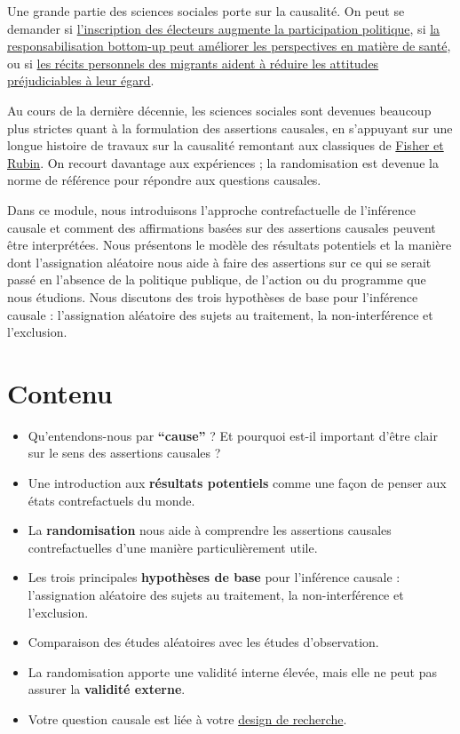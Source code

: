 \documentclass[
  12pt,
]{book}
\begin{document}
Une grande partie des sciences sociales porte sur la causalité. On peut se demander si \href{https://egap.org/resource/electoral-administration-in-kenya/}{l'inscription des électeurs augmente la participation politique}, si \href{https://egap.org/resource/does-bottom-up-accountability-work-evidence-from-uganda/}{la responsabilisation bottom-up peut améliorer les perspectives en matière de santé}, ou si \href{https://egap.org/resource/brief-70-how-personal-narratives-reduce-negative-attitudes-towards-immigrants-in-kenya/}{les récits personnels des migrants aident à réduire les attitudes préjudiciables à leur égard}.

Au cours de la dernière décennie, les sciences sociales sont devenues beaucoup plus strictes quant à la formulation des assertions causales, en s'appuyant sur une longue histoire de travaux sur la causalité remontant aux classiques de \protect\hyperlink{causalinference-classics}{Fisher et Rubin}. On recourt davantage aux expériences ; la randomisation est devenue la norme de référence pour répondre aux questions causales.

Dans ce module, nous introduisons l'approche contrefactuelle de l'inférence causale et comment des affirmations basées sur des assertions causales peuvent être interprétées. Nous présentons le modèle des résultats potentiels et la manière dont l'assignation aléatoire nous aide à faire des assertions sur ce qui se serait passé en l'absence de la politique publique, de l'action ou du programme que nous étudions. Nous discutons des trois hypothèses de base pour l'inférence causale : l'assignation aléatoire des sujets au traitement, la non-interférence et l'exclusion.

\hypertarget{contenu-1}{%
\section{Contenu}\label{contenu-1}}

\begin{itemize}
\item
  Qu'entendons-nous par \textbf{``cause''} ? Et pourquoi est-il important d'être clair sur le sens des assertions causales ?
\item
  Une introduction aux \textbf{résultats potentiels} comme une façon de penser aux états contrefactuels du monde.
\item
  La \textbf{randomisation} nous aide à comprendre les assertions causales contrefactuelles d'une manière particulièrement utile.
\item
  Les trois principales \textbf{hypothèses de base} pour l'inférence causale : l'assignation aléatoire des sujets au traitement, la non-interférence et l'exclusion.
\item
  Comparaison des études aléatoires avec les études d'observation.
\item
  La randomisation apporte une validité interne élevée, mais elle ne peut pas assurer la \textbf{validité externe}.
\item
  Votre question causale est liée à votre \href{the-research-design-process.html}{design de recherche}.
\end{itemize}
\end{document}

